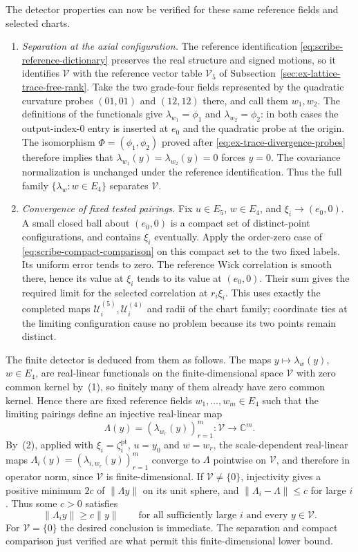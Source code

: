 The detector properties can now be verified for these same reference
fields and selected charts.
\begin{enumerate}
\item \emph{Separation at the axial configuration.} The reference
identification \eqref{eq:scribe-reference-dictionary} preserves the real
structure and signed motions, so it identifies $\mathcal V$ with the
reference vector table $\mathcal V_5$ of
Subsection~\ref{sec:ex-lattice-trace-free-rank}. Take the two grade-four
fields represented by the quadratic curvature probes $(01,01)$ and
$(12,12)$ there, and call them $w_1,w_2$. The definitions of the
functionals give $\lambda_{w_1}=\phi_1$ and
$\lambda_{w_2}=\phi_2$: in both cases the output-index-$0$ entry is
inserted at $e_0$ and the quadratic probe at the origin. The isomorphism
$\Phi=(\phi_1,\phi_2)$ proved after
\eqref{eq:ex-trace-divergence-probes} therefore implies that
$\lambda_{w_1}(y)=\lambda_{w_2}(y)=0$ forces $y=0$. The covariance
normalization is unchanged under the reference identification. Thus the
full family $\{\lambda_w:w\in E_4\}$ separates $\mathcal V$.
\item \emph{Convergence of fixed tested pairings.} Fix $u\in E_5$,
$w\in E_4$, and $\xi_i\to(e_0,0)$. A small closed ball about
$(e_0,0)$ is a compact set of distinct-point configurations, and contains
$\xi_i$ eventually. Apply the order-zero case of
\eqref{eq:scribe-compact-comparison} on this compact set to the two
fixed labels. Its uniform error tends to zero. The reference Wick
correlation is smooth there, hence its value at $\xi_i$ tends to its
value at $(e_0,0)$. Their sum gives the required limit for the selected
correlation at $r_i\xi_i$. This uses exactly the completed maps
$\mathcal U_i^{(5)},\mathcal U_i^{(4)}$ and radii of the chart family;
coordinate ties at the limiting configuration cause no problem because
its two points remain distinct.
\end{enumerate}
The finite detector is deduced from them as follows. The maps
$y\mapsto\lambda_w(y)$, $w\in E_4$, are real-linear functionals on the
finite-dimensional space $\mathcal V$ with zero common kernel by~(1), so
finitely many of them already have zero common kernel. Hence there are
fixed reference fields
$w_1,\ldots,w_m\in E_4$ such that the limiting pairings define an injective
real-linear map
\[
 \Lambda(y)=(\lambda_{w_r}(y))_{r=1}^m:
       \mathcal V\longrightarrow\mathbb C^m.
\]
By~(2), applied with $\xi_i=\zeta_i^{\mathrm{pt}}$, $u=y_0$ and
$w=w_r$, the scale-dependent real-linear maps
$\Lambda_i(y)=(\lambda_{i,w_r}(y))_{r=1}^m$
converge to $\Lambda$ pointwise on $\mathcal V$, and therefore in operator
norm, since $\mathcal V$ is finite-dimensional. If
$\mathcal V\neq\{0\}$, injectivity gives a
positive minimum $2c$ of $\|\Lambda y\|$ on its unit sphere, and
$\|\Lambda_i-\Lambda\|\le c$ for large $i$. Thus some $c>0$ satisfies
\begin{equation}
 \|\Lambda_i y\|\geq c\|y\|
 \qquad\text{for all sufficiently large }i\text{ and every }y\in\mathcal V.
 \label{eq:ex-trace-small-means-detector}
\end{equation}
For $\mathcal V=\{0\}$ the desired conclusion is immediate. The separation and compact comparison just verified are what permit
this finite-dimensional lower bound.

